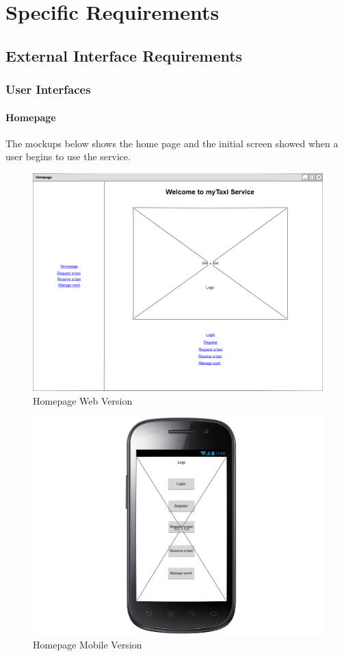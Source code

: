 \documentclass[a4paper,12pt,dvipsnames]{article}%
\begin{document}
\section{Specific Requirements}
\subsection{External Interface Requirements}
\subsubsection{User Interfaces}
\paragraph{Homepage}
The mockups below shows the home page and the initial screen showed when a user begins to use the service.
\begin{figure}[H]
\centering
\includegraphics[scale=0.3]{mockups/homepage_web.png}
\caption{Homepage Web Version}
\end{figure}
\begin{figure}[H]
\centering
\includegraphics[scale=0.3]{mockups/homepage_mobile.png}
\caption{Homepage Mobile Version}
\end{figure}
\break
\end{document}
